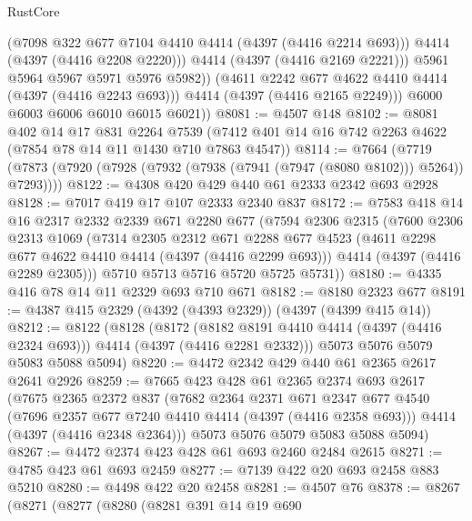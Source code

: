 \begin{lexlean}{RustCore}
\begin{coremodule}
                  (@7098 @322 @677 @7104 @4410 @4414 (@4397 (@4416 @2214 @693)))
                  @4414
                  (@4397 (@4416 @2208 @2220)))
                @4414
                (@4397 (@4416 @2169 @2221)))
              @5961
              @5964
              @5967
              @5971
              @5976
              @5982))
          (@4611 @2242 @677 @4622 @4410 @4414 (@4397 (@4416 @2243 @693)))
          @4414
          (@4397 (@4416 @2165 @2249)))
        @6000
        @6003
        @6006
        @6010
        @6015
        @6021))
@8081 := @4507 @148
@8102 := @8081
    @402
    @14
    @17
    @831
    @2264
    @7539
    (@7412 @401 @14 @16 @742 @2263 @4622 (@7854 @78 @14 @11 @1430 @710 @7863 @4547))
@8114 := @7664
    (@7719 (@7873 (@7920 (@7928 (@7932 (@7938 (@7941 (@7947 (@8080 @8102))) @5264)) @7293))))
@8122 := @4308 @420 @429 @440 @61 @2333 @2342 @693 @2928
@8128 := @7017 @419 @17 @107 @2333 @2340 @837
@8172 := @7583
    @418
    @14
    @16
    @2317
    @2332
    @2339
    @671
    @2280
    @677
    (@7594
      @2306
      @2315
      (@7600
        @2306
        @2313
        @1069
        (@7314
          @2305
          @2312
          @671
          @2288
          @677
          @4523
          (@4611 @2298 @677 @4622 @4410 @4414 (@4397 (@4416 @2299 @693)))
          @4414
          (@4397 (@4416 @2289 @2305)))
        @5710
        @5713
        @5716
        @5720
        @5725
        @5731))
@8180 := @4335 @416 @78 @14 @11 @2329 @693 @710 @671
@8182 := @8180 @2323 @677
@8191 := @4387 @415 @2329 (@4392 (@4393 @2329)) (@4397 (@4399 @415 @14))
@8212 := @8122
    (@8128
      (@8172 (@8182 @8191 @4410 @4414 (@4397 (@4416 @2324 @693))) @4414 (@4397 (@4416 @2281 @2332)))
      @5073
      @5076
      @5079
      @5083
      @5088
      @5094)
@8220 := @4472 @2342 @429 @440 @61 @2365 @2617 @2641 @2926
@8259 := @7665
    @423
    @428
    @61
    @2365
    @2374
    @693
    @2617
    (@7675
      @2365
      @2372
      @837
      (@7682
        @2364
        @2371
        @671
        @2347
        @677
        @4540
        (@7696 @2357 @677 @7240 @4410 @4414 (@4397 (@4416 @2358 @693)))
        @4414
        (@4397 (@4416 @2348 @2364)))
      @5073
      @5076
      @5079
      @5083
      @5088
      @5094)
@8267 := @4472 @2374 @423 @428 @61 @693 @2460 @2484 @2615
@8271 := @4785 @423 @61 @693 @2459
@8277 := @7139 @422 @20 @693 @2458 @883 @5210
@8280 := @4498 @422 @20 @2458
@8281 := @4507 @76
@8378 := @8267
    (@8271
      (@8277
        (@8280
          (@8281
            @391
            @14
            @19
            @690

\end{coremodule}
\end{lexlean}
